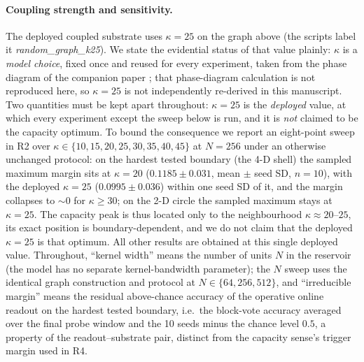 \documentclass[preprint,12pt]{elsarticle}
\begin{document}
\paragraph{Coupling strength and sensitivity.} The deployed coupled substrate
uses $\kappa=25$ on the graph above (the scripts label it
\textit{random\_graph\_k25}). We state the evidential status of that value
plainly: $\kappa$ is a \emph{model choice}, fixed once and reused for every
experiment, taken from the phase diagram of the companion paper
\cite{companionA}; that phase-diagram calculation is not reproduced here, so
$\kappa=25$ is not independently re-derived in this manuscript. Two quantities
must be kept apart throughout: $\kappa=25$ is the \emph{deployed} value, at
which every experiment except the sweep below is run, and it is \emph{not}
claimed to be the capacity optimum. To bound the consequence we report an
eight-point sweep in R2 over
$\kappa\in\{10,15,20,25,30,35,40,45\}$ at $N=256$ under an otherwise unchanged
protocol: on the hardest tested boundary (the 4-D shell) the sampled maximum
margin sits at $\kappa=20$ ($0.1185\pm0.031$, mean $\pm$ seed SD, $n=10$),
with the deployed $\kappa=25$ ($0.0995\pm0.036$) within one seed SD of it,
and the margin collapses to $\sim0$ for $\kappa\geq30$; on the 2-D circle the
sampled maximum stays at $\kappa=25$. The capacity peak is thus located only
to the neighbourhood $\kappa\approx20$--$25$, its exact position is
boundary-dependent, and we do not claim that the deployed $\kappa=25$ is that
optimum. All other
results are obtained at this single deployed value. Throughout, ``kernel width'' means the number of
units $N$ in the reservoir (the model has no separate kernel-bandwidth
parameter); the $N$ sweep uses the identical graph construction and protocol
at $N\in\{64,256,512\}$, and ``irreducible margin'' means the residual
above-chance accuracy of the operative online readout on the hardest tested
boundary, i.e.\ the block-vote accuracy averaged over the final probe window
and the 10 seeds minus the chance level $0.5$, a property of the
readout--substrate pair, distinct from the capacity sense's trigger margin
used in R4.
\end{document}
